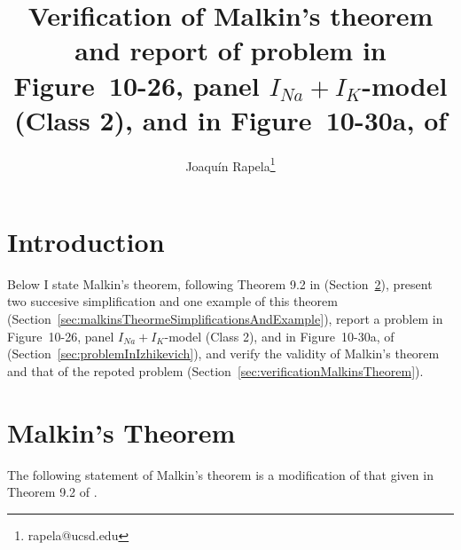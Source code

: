 \documentclass{article}
\begin{document}
\title{Verification of Malkin's theorem and report of problem in Figure~10-26,
panel $I_{Na}+I_K$-model (Class 2), and in Figure~10-30a, of \citet{izhikevich07}}
\author{Joaqu\'{i}n Rapela\thanks{rapela@ucsd.edu}}
\maketitle

\tableofcontents

\section{Introduction}

Below I state Malkin's theorem, following Theorem 9.2 in
\citet{hoppensteadtAndIzhikevich97} (Section~\ref{sec:malkinsTheorem}),
present two succesive simplification and one example of this theorem
(Section~\ref{sec:malkinsTheormeSimplificationsAndExample}),
%
report a problem in Figure~10-26, panel $I_{Na}+I_K$-model (Class 2), and in
Figure~10-30a, of
\citet{izhikevich07} (Section~\ref{sec:problemInIzhikevich}), and verify the
validity of Malkin's theorem and that of the repoted problem
(Section~\ref{sec:verificationMalkinsTheorem}).

\section{Malkin's Theorem}
\label{sec:malkinsTheorem}

The following statement of Malkin's theorem is a modification of that given in
Theorem 9.2 of \citet{hoppensteadtAndIzhikevich97}. 
\end{document}
